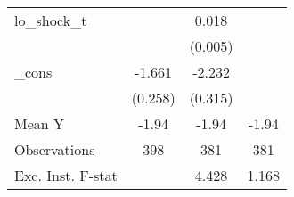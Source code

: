 {\begin{tabular}{l*{3}{c}}
\addlinespace
lo\_shock\_t  &                     &       0.018\sym{***}&                     \\
            &                     &     (0.005)         &                     \\
\addlinespace
\_cons      &      -1.661\sym{***}&      -2.232\sym{***}&                     \\
            &     (0.258)         &     (0.315)         &                     \\
\midrule
Mean Y      &       -1.94         &       -1.94         &       -1.94         \\
Observations&         398         &         381         &         381         \\
Exc. Inst. F-stat&                     &       4.428         &       1.168         \\
\bottomrule
\end{tabular}
}
